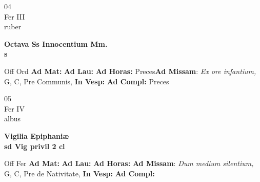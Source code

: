 \documentclass[10pt, openany]{book}
\begin{document}
        \begin{center}
            \begin{minipage}{3.5in}
                \vspace{2em}
                \begin{minipage}{0.5in}
                    {\Huge 04} \\
                    {\normalsize Fer III} \\
                    {\normalsize ruber}
                \end{minipage}
                \begin{minipage}{3.0in}
                    \textbf{ \large Octava Ss Innocentium Mm. \\
                    \textnormal{\normalsize s}} \\ 
                \end{minipage}
                \begin{justify}Off Ord
                    \textbf{Ad Mat: }
                    \textbf{Ad Lau: }
                    \textbf{Ad Horas: }Preces\textbf{Ad Missam}: \textit{Ex ore infantium,} G, C, Pre Communis,  
                    \textbf{In Vesp: }
                    \textbf{Ad Compl: }Preces
                \end{justify}
            \end{minipage}
        \end{center}
    
        \begin{center}
            \begin{minipage}{3.5in}
                \vspace{2em}
                \begin{minipage}{0.5in}
                    {\Huge 05} \\
                    {\normalsize Fer IV} \\
                    {\normalsize albus}
                \end{minipage}
                \begin{minipage}{3.0in}
                    \textbf{ \large Vigilia Epiphaniæ \\
                    \textnormal{\normalsize sd Vig privil 2 cl}} \\ 
                \end{minipage}
                \begin{justify}Off Fer
                    \textbf{Ad Mat: }
                    \textbf{Ad Lau: }
                    \textbf{Ad Horas: }\textbf{Ad Missam}: \textit{Dum medium silentium,} G, C, Pre de Nativitate,  
                    \textbf{In Vesp: }
                    \textbf{Ad Compl: }
                \end{justify}
            \end{minipage}
        \end{center}
    
\end{document}
